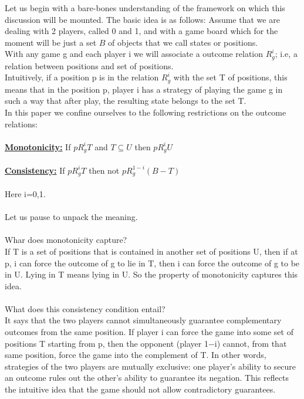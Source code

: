 \documentclass[12pt]{article}
\begin{document}
Let us begin with a bare-bones understanding of the framework on which this 
discussion will be mounted. The basic idea is as follows: Assume that we are dealing with 2 players, called 0 and 1, and with a game board which for the moment will be just a set $B$ of objects that we call states or positions. \\
With any game g and each player i we will associate a outcome relation $R_{g}^{i}$; i.e, a relation between positions and set of positions. \\
Intuitively, if a position p is in the relation $R_{g}^{i}$ with the set T of positions, this means that in the position p, player i has a strategy of playing the game g in such a way that after play, the resulting state belongs to the set T. \\ 
In this paper we confine ourselves to the following restrictions on the outcome relations: \\ \\
\underline{\textbf{Monotonicity:}} If $pR_{g}^{i}T$ and $T\subseteq U$ then $pR_{g}^{i}U$ \\ \\
\underline{\textbf{Consistency:}} If $pR_{g}^{i}T$ then not $pR_{g}^{1-i}(B-T)$ \\ \\
Here i=0,1. \\ \\
Let us pause to unpack the meaning. \\ \\
Whar does monotonicity capture? \\
If T is a set of positions that is contained in another set of positions U, then if at p, i can force the outcome of g to lie in T, then i can force the outcome of g to be in U. Lying in T means lying in U. So the property of monotonicity captures this idea. \\ \\
What does this consistency condition entail? \\ 
It says that the two players cannot simultaneously guarantee complementary outcomes from the same position. If player i can force the game into some set of positions T starting from p, then the opponent (player 1$-$i) cannot, from that same position, force the game into the complement of T. In other words, strategies of the two players are mutually exclusive: one player’s ability to secure an outcome rules out the other’s ability to guarantee its negation. This reflects the intuitive idea that the game should not allow contradictory guarantees. \\ \\
\end{document}
